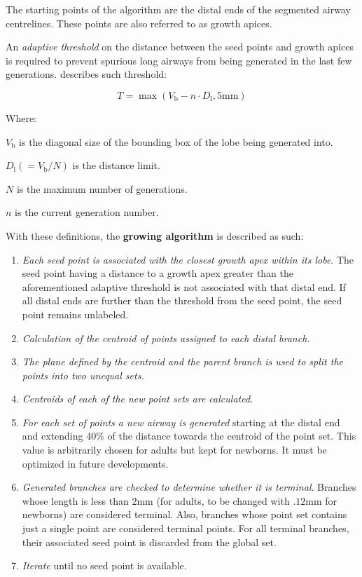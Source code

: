 The starting points of the algorithm are the distal ends of the
segmented airway centrelines.  These points are also referred to as
growth apices.

An \emph{adaptive threshold} on the distance between the seed points
and growth apices is required to prevent spurious long airways from being
generated in the last few generations.  
describes such threshold:

\begin{equation}
  T = \max(V_{\text{b}} - n\cdot D_{\text{l}}, 5\text{mm})
  \label{eq:airway_threshold}
\end{equation}

Where:
\begin{description}
\item $V_{\text{b}}$ is the diagonal size of the bounding box of the lobe being
  generated into.
\item $D_{\text{l}} (= {V_{\text{b}}/{N}})$ is the distance limit.
\item $N$ is the maximum number of generations.
\item $n$ is the current generation number.
\end{description}

With these definitions, the \textbf{growing algorithm} is described as
such:

\begin{enumerate}
\item \emph{Each seed point is associated with the closest growth apex
    within its lobe}.  The seed point having a distance to a
  growth apex greater than the aforementioned adaptive threshold is
  not associated with that distal end.  If all distal ends are further
  than the threshold from the seed point, the seed point remains
  unlabeled.
\item \emph{Calculation of the centroid of points assigned to each
    distal branch.}
\item \emph{The plane defined by the centroid and the parent branch is
    used to split the points into two unequal sets.}
\item \emph{Centroids of each of the new point sets are calculated.}
\item \emph{For each set of points a new airway is generated} starting
  at the distal end and extending 40\% of the distance towards the
  centroid of the point set.  This value is arbitrarily chosen for adults but kept for
  newborns.  It must be optimized in future developments.
\item \emph{Generated branches are checked to determine whether it is
    terminal}.  Branches whose length is less than $2\text{mm}$ (for
  adults, to be changed with $.12\text{mm}$ for newborns) are
  considered terminal.  Also, branches whose point set contains just a
  single point are considered terminal points.  For all
  terminal branches, their associated seed point is discarded from the
  global set.
\item \emph{Iterate} until no seed point is available.
\end{enumerate}

